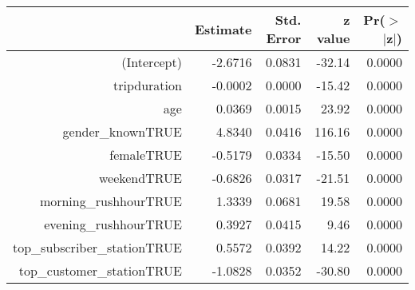 \begin{table}[ht]
\begin{heightresizeenv}
\begin{tabular}{rrrrr}
  \toprule
 & Estimate & Std. Error & z value & Pr($>$$|$z$|$) \\ 
  \midrule
(Intercept) & -2.6716 & 0.0831 & -32.14 & 0.0000 \\ 
  tripduration & -0.0002 & 0.0000 & -15.42 & 0.0000 \\ 
  age & 0.0369 & 0.0015 & 23.92 & 0.0000 \\ 
  gender\_knownTRUE & 4.8340 & 0.0416 & 116.16 & 0.0000 \\ 
  femaleTRUE & -0.5179 & 0.0334 & -15.50 & 0.0000 \\ 
  weekendTRUE & -0.6826 & 0.0317 & -21.51 & 0.0000 \\ 
  morning\_rushhourTRUE & 1.3339 & 0.0681 & 19.58 & 0.0000 \\ 
  evening\_rushhourTRUE & 0.3927 & 0.0415 & 9.46 & 0.0000 \\ 
  top\_subscriber\_stationTRUE & 0.5572 & 0.0392 & 14.22 & 0.0000 \\ 
  top\_customer\_stationTRUE & -1.0828 & 0.0352 & -30.80 & 0.0000 \\ 
   \bottomrule
\end{tabular}
\end{heightresizeenv}
\end{table}
